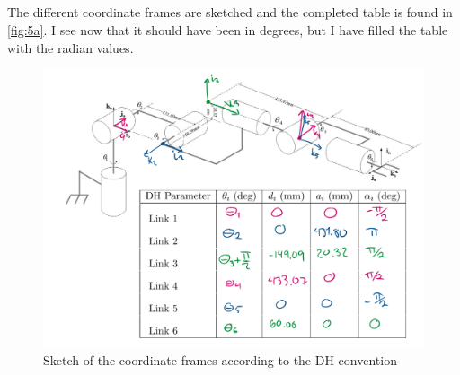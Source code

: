 \documentclass[a4paper]{scrartcl}
\begin{document}
\subsection{}
The different coordinate frames are sketched and the completed table is found in \autoref{fig:5a}. I see now that it should have been in degrees, but I have filled the table with the radian values.   
\begin{figure}[h!]
    \centering
    \includegraphics[width = .95\textwidth]{5a.PNG}
    \caption{Sketch of the coordinate frames according to the DH-convention}
    \label{fig:5a}
\end{figure}
\end{document}
